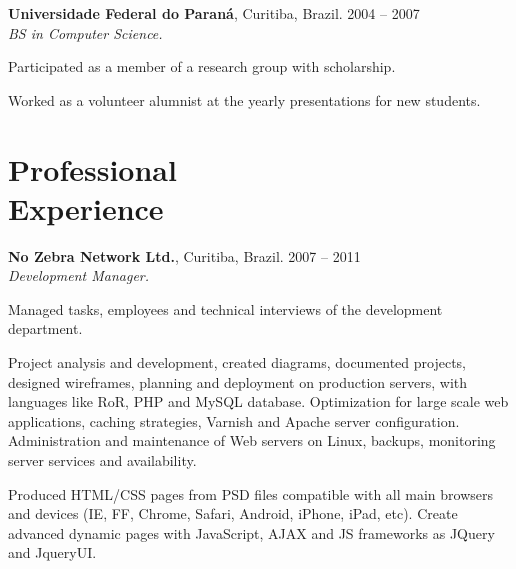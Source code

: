 \documentclass[margin,centered,10pt]{resume}
\begin{document}
\begin{resume}
    \textbf{Universidade Federal do Paraná}, Curitiba, Brazil.
    \hfill 2004 – 2007
    \\
    \textsl{BS in Computer Science.}
    \vspace{-3mm}\\\vspace{-1mm}%
    \begin{list2}
        \item Participated as a member of a research group with scholarship.
        \item Worked as a volunteer alumnist at the yearly presentations for new students.
    \end{list2}\vspace{-1.5mm}%

    \section{\mysidestyle Professional\\Experience}

    \textbf{No Zebra Network Ltd.}, Curitiba, Brazil.
    \hfill 2007 – 2011\\
    \textsl{Development Manager.}
    \vspace{-3mm}\\\vspace{-1mm}%
    \begin{list2}
        \item Managed tasks, employees and technical interviews of the development department.
        \item Project analysis and development, created diagrams, documented projects, designed wireframes, planning and deployment on production servers, with languages like RoR, PHP and MySQL database. Optimization for large scale web applications, caching strategies, Varnish and Apache server configuration. Administration and maintenance of Web servers on Linux, backups, monitoring server services and availability. 
        \item Produced HTML/CSS pages from PSD files compatible with all main browsers and devices (IE, FF, Chrome, Safari, Android, iPhone, iPad, etc).  Create advanced dynamic pages with JavaScript, AJAX and JS frameworks as JQuery and JqueryUI.
    \end{list2}\vspace{-1.5mm}%


\end{resume}
\end{document}
